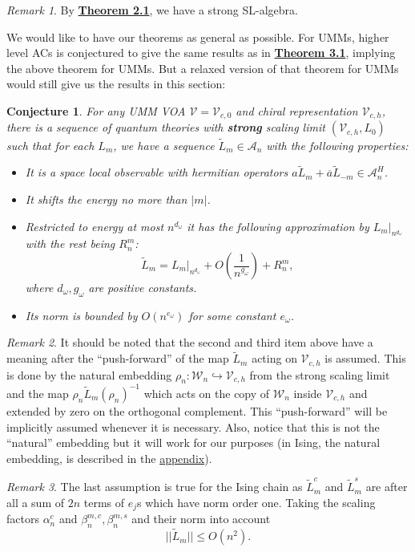 \documentclass[twoside,11pt,titlepage]{amsart}
\renewcommand{\=}[1]{\stackrel{#1}{=}} %
\newtheorem{cnj}[thm]{Conjecture}
\theoremstyle{definition}
\theoremstyle{remark}
\newtheorem{rmk}{Remark}
\begin{document}
\begin{rmk}\label{rmk5}
By \hyperref[thm2.1]{\textbf{Theorem 2.1}}, we have a strong SL-algebra.
\end{rmk}
We would like to have our theorems as general as possible. For UMMs, higher level ACs \cite{gils2013anyonic} is conjectured to give the same results as in \hyperref[thm3.1]{\textbf{Theorem 3.1}}, implying the above theorem for UMMs. But a relaxed version of that theorem for UMMs would still give us the results in this section:
\begin{cnj}\label{cnj4.3}
For any UMM VOA $\mathcal{V}=\mathcal{V}_{c,0}$ and chiral representation $\mathcal{V}_{c,h}$, there is a sequence of quantum theories with \textbf{strong} scaling limit $(\mathcal{V}_{c,h},L_0)$ such that for each $L_m$, we have a sequence $\widetilde{L}_m \in \mathcal{A}_n$ with the following properties:
\begin{itemize}
    \item It is a space local observable with hermitian operators $a\widetilde{L}_m+\overline{a}\widetilde{L}_{-m} \in \mathcal{A}_n^H$.
    \item It shifts the energy no more than $|m|$.
    \item Restricted to energy at most $n^{d_\omega}$ it has the following approximation by $L_m|_{n^{
    d_\omega}}$ with the rest being $R_{n}^m$:
    $$\widetilde{L}_m=L_m|_{n^{d_\omega}}+O(\frac{1}{n^{g_\omega}})+R_{n}^m,$$
    where $d_\omega,g_\omega$ are positive constants.
    \item Its norm is bounded by $O(n^{e_\omega})$ for some constant $e_\omega$.
\end{itemize}
\end{cnj}
\begin{rmk}\label{rmk6}
It should be noted that the second and third item above have a meaning after the ``push-forward'' of the map $\widetilde{L}_m$ acting on $\mathcal{V}_{c,h}$ is assumed. This is done by the natural embedding $\rho_n: \mathcal{W}_n \hookrightarrow \mathcal{V}_{c,h}$ from the strong scaling limit and the map $\rho_n\widetilde{L}_m(\rho_n)^{-1}$ which acts on the copy of $\mathcal{W}_n$ inside $\mathcal{V}_{c,h}$ and extended by zero on the orthogonal complement. This ``push-forward'' will be implicitly assumed whenever it is necessary. Also, notice that this is not the ``natural'' embedding but it will work for our purposes (in Ising, the natural embedding, is described in the \hyperref[A.1]{appendix}).
\end{rmk}
\begin{rmk}\label{rmk7}
The last assumption is true for the Ising chain as $\widetilde{L}_m^{c}$ and $\widetilde{L}_m^s$ are after all a sum of $2n$ terms of $e_j$s which have norm order one. Taking the scaling factors $\alpha_n^c$ and $\beta_n^{m,c},\beta_n^{m,s}$ and their norm into account
$$||\widetilde{L}_m ||\le  O(n^2).$$
\end{rmk}
\end{document}
